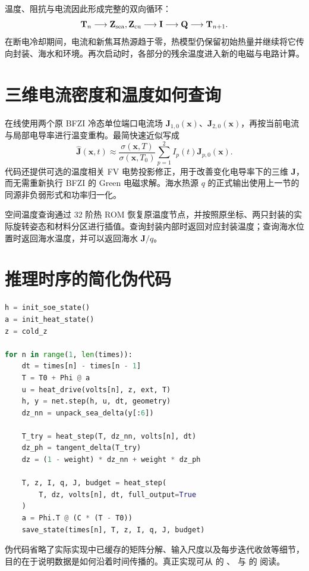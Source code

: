 温度、阻抗与电流因此形成完整的双向循环：
\[
\mathbf T_n
\longrightarrow\mathbf Z_{\mathrm{sea}},\mathbf Z_{\mathrm{cu}}
\longrightarrow\mathbf I
\longrightarrow\mathbf Q
\longrightarrow\mathbf T_{n+1}.
\]
在断电冷却期间，电流和新焦耳热源趋于零，热模型仍保留初始热量并继续将它传向封装、海水和环境。再次启动时，各部分的残余温度进入新的电磁与电路计算。

\section{三维电流密度和温度如何查询}
在线使用两个原 BFZI 冷态单位端口电流场 $\mathbf J_{1,0}(\mathbf x)$、$\mathbf J_{2,0}(\mathbf x)$，再按当前电流与局部电导率进行温变重构。最简快速近似写成
\[
\widehat{\mathbf J}(\mathbf x,t)\approx
\frac{\sigma(\mathbf x,T)}{\sigma(\mathbf x,T_0)}
\sum_{p=1}^2I_p(t)\mathbf J_{p,0}(\mathbf x).
\]
代码还提供可选的温度相关 FV 电势投影修正，用于改善变化电导率下的三维 $\mathbf J$，而无需重新执行 BFZI 的 Green 电磁求解。海水热源 $q$ 的正式输出使用上一节的同源非负弱形式和功率归一化。

空间温度查询通过 32 阶热 ROM 恢复原温度节点，并按照原坐标、两只封装的实际旋转姿态和材料分区进行插值。查询封装内部时返回对应封装温度；查询海水位置时返回海水温度，并可以返回海水 $\mathbf J/q$。

\section{推理时序的简化伪代码}
\begin{lstlisting}[language=Python,caption={具有海水温度校正的自主时程推理}]
h = init_soe_state()
a = init_heat_state()
z = cold_z

for n in range(1, len(times)):
    dt = times[n] - times[n - 1]
    T = T0 + Phi @ a
    u = heat_drive(volts[n], z, ext, T)
    h, y = net.step(h, u, dt, geometry)
    dz_nn = unpack_sea_delta(y[:6])

    T_try = heat_step(T, dz_nn, volts[n], dt)
    dz_ph = tangent_delta(T_try)
    dz = (1 - weight) * dz_nn + weight * dz_ph

    T, z, I, q, J, budget = heat_step(
        T, dz, volts[n], dt, full_output=True
    )
    a = Phi.T @ (C * (T - T0))
    save_state(times[n], T, z, I, q, J, budget)
\end{lstlisting}
伪代码省略了实际实现中已缓存的矩阵分解、输入尺度以及每步迭代收敛等细节，目的在于说明数据是如何沿着时间传播的。真正实现可从  的 、 与  的  阅读。

